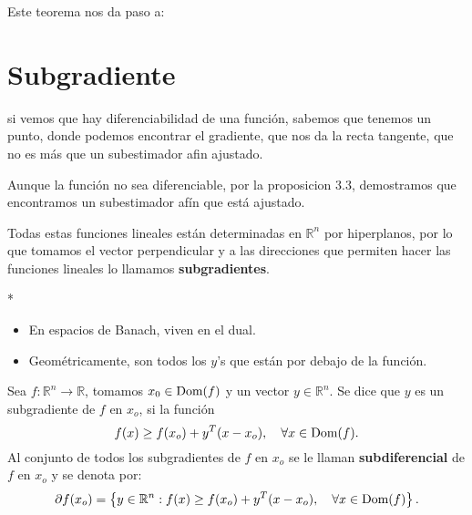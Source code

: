 \begin{paracol}{2}
Este teorema nos da paso a:

\section{Subgradiente}
si vemos que hay diferenciabilidad de una función, sabemos que tenemos un punto, donde podemos encontrar el gradiente, que nos da la recta tangente, que no es más que un subestimador afin ajustado. 
\begin{center}
\end{center}
Aunque la función no sea diferenciable, por la proposicion 3.3, demostramos que encontramos un subestimador afín que está ajustado.
\begin{center}
\end{center}
Todas estas funciones lineales están determinadas en $\mathbb{R}^n$ por hiperplanos, por lo que tomamos el vector perpendicular y a las direcciones que permiten hacer las funciones lineales lo llamamos \textbf{subgradientes}.

\switchcolumn[1]*{\noindent\scriptsize
    \begin{itemize}
	\item En espacios de Banach, viven en el dual.
	\item Geométricamente, son todos los $y$'s que están por debajo de la función.
    \end{itemize}
}
\switchcolumn[0]\noindent
\begin{def.} Sea $f:\mathbb{R}^n\to \mathbb{R}$, tomamos $x_0\in \mathop{\mbox{\normalfont Dom}}\nolimits(f)$ y un vector $y\in \mathbb{R}^n$. Se dice que $y$ es un subgradiente de $f$ en $x_o$, si la función 
    $$f(x)\geq f(x_o)+y^T(x-x_o), \quad \forall x\in \mathop{\mbox{\normalfont Dom}}\nolimits(f).$$
    Al conjunto de todos los subgradientes de $f$ en $x_o$ se le llaman \textbf{subdiferencial} de $f$ en $x_o$ y se denota por:
    $$\partial f(x_o)=\left\{y\in \mathbb{R}^n: f(x)\geq f(x_o)+y^T(x-x_o), \quad \forall x\in \mathop{\mbox{\normalfont Dom}}\nolimits(f)\right\}.$$
\end{def.}


\end{paracol}
